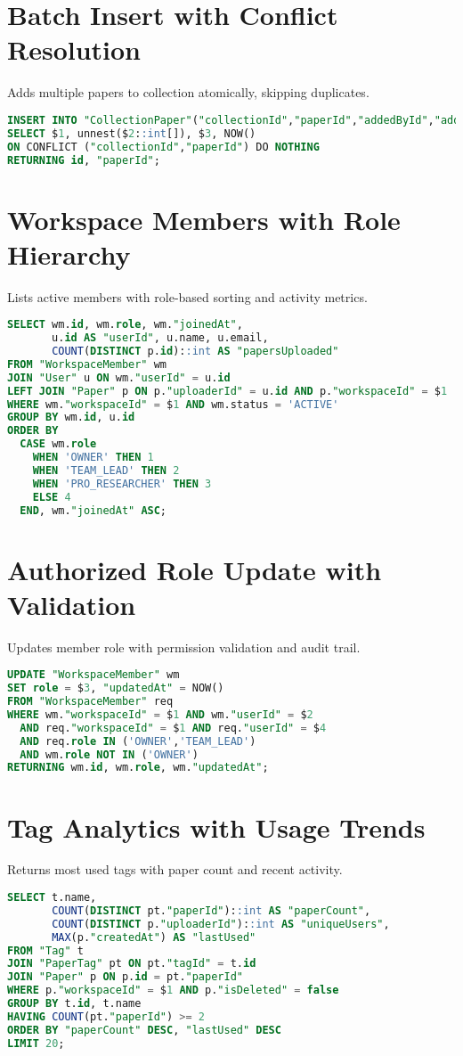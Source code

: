 \section{Batch Insert with Conflict Resolution}
Adds multiple papers to collection atomically, skipping duplicates.
\begin{lstlisting}[language=SQL]
INSERT INTO "CollectionPaper"("collectionId","paperId","addedById","addedAt")
SELECT $1, unnest($2::int[]), $3, NOW()
ON CONFLICT ("collectionId","paperId") DO NOTHING
RETURNING id, "paperId";
\end{lstlisting}

\section{Workspace Members with Role Hierarchy}
Lists active members with role-based sorting and activity metrics.
\begin{lstlisting}[language=SQL]
SELECT wm.id, wm.role, wm."joinedAt",
       u.id AS "userId", u.name, u.email,
       COUNT(DISTINCT p.id)::int AS "papersUploaded"
FROM "WorkspaceMember" wm
JOIN "User" u ON wm."userId" = u.id
LEFT JOIN "Paper" p ON p."uploaderId" = u.id AND p."workspaceId" = $1
WHERE wm."workspaceId" = $1 AND wm.status = 'ACTIVE'
GROUP BY wm.id, u.id
ORDER BY
  CASE wm.role
    WHEN 'OWNER' THEN 1
    WHEN 'TEAM_LEAD' THEN 2
    WHEN 'PRO_RESEARCHER' THEN 3
    ELSE 4
  END, wm."joinedAt" ASC;
\end{lstlisting}

\section{Authorized Role Update with Validation}
Updates member role with permission validation and audit trail.
\begin{lstlisting}[language=SQL]
UPDATE "WorkspaceMember" wm
SET role = $3, "updatedAt" = NOW()
FROM "WorkspaceMember" req
WHERE wm."workspaceId" = $1 AND wm."userId" = $2
  AND req."workspaceId" = $1 AND req."userId" = $4
  AND req.role IN ('OWNER','TEAM_LEAD')
  AND wm.role NOT IN ('OWNER')
RETURNING wm.id, wm.role, wm."updatedAt";
\end{lstlisting}

\section{Tag Analytics with Usage Trends}
Returns most used tags with paper count and recent activity.
\begin{lstlisting}[language=SQL]
SELECT t.name,
       COUNT(DISTINCT pt."paperId")::int AS "paperCount",
       COUNT(DISTINCT p."uploaderId")::int AS "uniqueUsers",
       MAX(p."createdAt") AS "lastUsed"
FROM "Tag" t
JOIN "PaperTag" pt ON pt."tagId" = t.id
JOIN "Paper" p ON p.id = pt."paperId"
WHERE p."workspaceId" = $1 AND p."isDeleted" = false
GROUP BY t.id, t.name
HAVING COUNT(pt."paperId") >= 2
ORDER BY "paperCount" DESC, "lastUsed" DESC
LIMIT 20;
\end{lstlisting}

